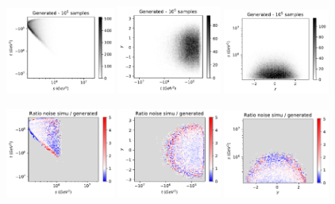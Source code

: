 \documentclass[twocolumn,preprintnumbers,superscriptaddress]{revtex4-2}
\begin{document}
\begin{figure}

  \includegraphics[width=0.32\textwidth]{plots/hardware_noise_simulation/s-t_FAKE_100k_noise-simu.pdf}%
  \includegraphics[width=0.305\textwidth]{plots/hardware_noise_simulation/t-y_FAKE_100k_noise-simu.pdf}%
  \includegraphics[width=0.31\textwidth]{plots/hardware_noise_simulation/y-s_FAKE_100k_noise-simu.pdf}

  \includegraphics[width=0.32\textwidth]{plots/hardware_noise_simulation/s-t_RATIO_100k_noise-generated.pdf}%
  \includegraphics[width=0.305\textwidth]{plots/hardware_noise_simulation/t-y_RATIO_100k_noise-generated.pdf}%
  \includegraphics[width=0.31\textwidth]{plots/hardware_noise_simulation/y-s_RATIO_100k_noise-generated.pdf}


\end{figure}
\end{document}
